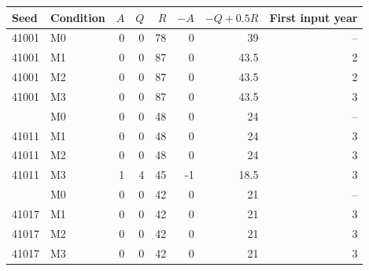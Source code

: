 \begin{tabular}{@{}llrrrrrr@{}}
\toprule
Seed & Condition & $A$ & $Q$ & $R$ & $-A$ & $-Q+0.5R$ & First input year\\
\midrule
41001&M0&0&0&78&0&39&--\\
41001&M1&0&0&87&0&43.5&2\\
41001&M2&0&0&87&0&43.5&2\\
41001&M3&0&0&87&0&43.5&3\\
\addlinespace
41011&M0&0&0&48&0&24&--\\
41011&M1&0&0&48&0&24&3\\
41011&M2&0&0&48&0&24&3\\
41011&M3&1&4&45&-1&18.5&3\\
\addlinespace
41017&M0&0&0&42&0&21&--\\
41017&M1&0&0&42&0&21&3\\
41017&M2&0&0&42&0&21&3\\
41017&M3&0&0&42&0&21&3\\
\bottomrule
\end{tabular}
